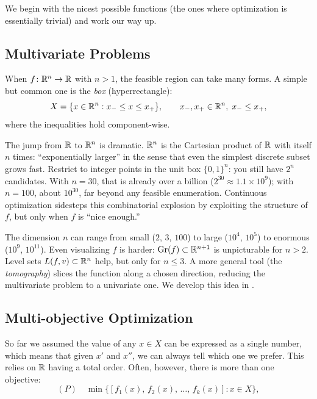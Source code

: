 We begin with the nicest possible functions (the ones where optimization is essentially trivial) and work our way up.


\subsection{Multivariate Problems}\label{sec:multivariate}

\begin{definition}\label{def:multivariate}
	When $f \colon \mathbb{R}^n \to \mathbb{R}$ with $n > 1$, the feasible region can take many forms.
	A simple but common one is the \emph{box} (hyperrectangle):
	\begin{equation}\label{eq:box-constraint}
		X = \{x \in \mathbb{R}^n : x_- \leq x \leq x_+\},
		\qquad x_-, x_+ \in \mathbb{R}^n,\; x_- \leq x_+,
	\end{equation}
	where the inequalities hold component-wise.
\end{definition}

The jump from $\mathbb{R}$ to $\mathbb{R}^n$ is dramatic.
$\mathbb{R}^n$ is the Cartesian product of $\mathbb{R}$ with itself $n$ times: ``exponentially larger'' in the sense that even the simplest discrete subset grows fast.
Restrict to integer points in the unit box $\{0,1\}^n$: you still have $2^n$ candidates.
With $n = 30$, that is already over a billion ($2^{30} \approx 1.1 \times 10^9$); with $n = 100$, about $10^{30}$, far beyond any feasible enumeration.
Continuous optimization sidesteps this combinatorial explosion by exploiting the structure of $f$, but only when $f$ is ``nice enough.''

The dimension $n$ can range from small ($2$, $3$, $100$) to large ($10^4$, $10^5$) to enormous ($10^9$, $10^{11}$).
Even visualizing $f$ is harder: $\operatorname{Gr}(f) \subset \mathbb{R}^{n+1}$ is unpicturable for $n > 2$.
Level sets $L(f, v) \subset \mathbb{R}^n$ help, but only for $n \leq 3$.
A more general tool (the \emph{tomography}) slices the function along a chosen direction, reducing the multivariate problem to a univariate one.
We develop this idea in .


\subsection{Multi-objective Optimization}\label{sec:multi-obj}

So far we assumed the value of any $x \in X$ can be expressed as a single number, which means that given $x'$ and $x''$, we can always tell which one we prefer.
This relies on $\mathbb{R}$ having a total order.
Often, however, there is more than one objective:
\begin{equation}
    (P) \quad \min\bigl\{[f_1(x),\, f_2(x),\, \dots,\, f_k(x)] : x \in X\bigr\},
\end{equation}

